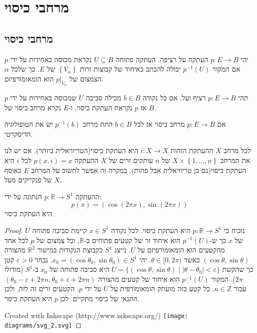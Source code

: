 \documentclass{tstextbook}
\begin{document}
  \chapter{מרחבי כיסוי}

\section{מרחבי כיסוי}

\begin{definition}
יהי \(p:E\to B\) העתקה על רציפה. העתקה פתוחה \(U\subseteq B\) נקראת מכוסה באחידות על ידי \(p\) אם המקור \(p ^{-1}(U)\) יכולה להכתב כאיחוד של קבוצות זרות \(\left\{  V_{\alpha}  \right\}\) של \(E\). כך שלכל \(\alpha\) הצמצום של \(p|_{V_{\alpha}}\) הוא הומאומורפיזם.

\end{definition}
\begin{definition}
תהי \(p:E\to B\) רציף ועל. אם כל נקודה \(b \in B\) מכילה סביבה \(U\) שמכוסה באחידות על ידי \(p\) אז \(p\) נקראת העתקת כיסוי, ו-\(E\) נקרא מרחב כיסוי של \(B\).

\end{definition}
\begin{remark}
אם \(p:E\to B\) מרחב כיסוי אז לכל \(b \in B\) התת מרחב \(p ^{-1}(b)\) יש את הטופולוגיה הדיסקרטי.

\end{remark}
\begin{example}
לכל מרחב \(X\) ההעתקת הזהות \(i:X\to X\) היא העתקת כיסוי(הטריוויאלית ביותר). אם יש לנו את המרחב \(X\times \left\{  1,\dots,n \right\}\) של \(n\) עותקים זרים של \(X\) ההעתקה \(p(x,i)=x\) לכל \(i\) היא העתקת כיסוי(גם כן טריוויאלית אבל פחות). במקרה זה אפשר לחשוב על המרחב \(E\) כאוסף של פנקייקים מעל \(X\).

\end{example}
\begin{example}
ההעתקה \(p:\mathbb{R}\to S^{1}\) הנתונה על ידי:
$$p(x)=\left( \cos\left( 2\pi x \right),\sin\left( 2\pi x \right) \right)$$
היא העתקת כיסוי.

\end{example}
\begin{proof}
נוכיח כי \(p:\mathbb{R}\to S^{1}\) היא העתקת כיסוי. לכל נקודה \(x\in S^{1}\) קיימת סביבה פתוחה \(U\) של \(x\) כך ש-\(p^{-1}(U)\) הוא איחוד זר של קטעים פתוחים ב-\(\mathbb{R}\), וכל צמצום של \(p\) לכל אחד מהקטעים הוא הומאומורפיזם על \(U\).
נייצג \(S^{1}\) כקבוצת הנקודות במישור \(\mathbb{R}^{2}\) מהצורה \((\cos\theta,\sin\theta)\) כאשר \(\theta\in[0,2\pi)\). יהי \(x_{0}=(\cos\theta_{0},\sin\theta_{0})\in S^{1}\). נבחר \(\varepsilon>0\) קטן כך שהקשת \(U=\{(\cos\theta,\sin\theta)\mid |\theta-\theta_{0}|<\varepsilon\}\) היא סביבה פתוחה של \(x_{0}\) ב-\(S^{1}\) (מודולו \(2\pi\)).
המקור \(p^{-1}(U)\) הוא איחוד של קטעים מהצורה \((\theta_{0}-\varepsilon+2\pi n,\theta_{0}+\varepsilon+2\pi n)\) עבור \(n\in\mathbb{Z}\). כל קטע כזה מועתק הומאומורפית על \(U\) על ידי \(p\). הקטעים זרים זה לזה, ולכן התנאי של כיסוי מתקיים.
לכן \(p\) היא העתקת כיסוי.

 Created with Inkscape (http://www.inkscape.org/) \texttt{[image: diagrams/svg\_2.svg]}
\end{proof}
\end{document}
